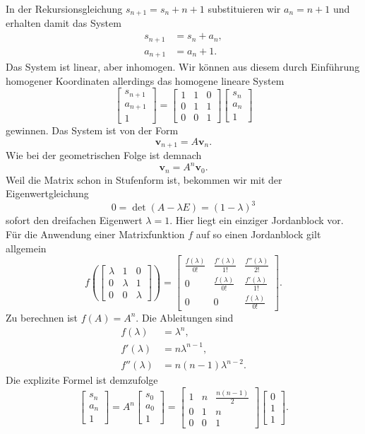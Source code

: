 \documentclass[a4paper,10pt,fleqn,twocolumn,twoside]{scrartcl}
\newcommand{\bvec}[1]{\mathbf{#1}}
\begin{document}
In der Rekursionsgleichung $s_{n+1} = s_n+n+1$ substituieren wir
$a_n = n+1$ und erhalten damit das System
\begin{align*}
s_{n+1} &= s_n + a_n,\\
a_{n+1} &= a_n + 1.
\end{align*}
Das System ist linear, aber inhomogen. Wir können aus diesem durch
Einführung homogener Koordinaten allerdings das homogene
lineare System
\[\begin{bmatrix}
s_{n+1}\\ a_{n+1}\\ 1
\end{bmatrix} = \begin{bmatrix}
1 & 1 & 0\\
0 & 1 & 1\\
0 & 0 & 1
\end{bmatrix}
\begin{bmatrix}
s_n\\ a_n\\ 1
\end{bmatrix}\]
gewinnen. Das System ist von der Form
\[\bvec v_{n+1} = A\bvec v_{n}.\]
Wie bei der geometrischen Folge ist demnach
\[\bvec v_n = A^n\bvec v_0.\]
Weil die Matrix schon in Stufenform ist, bekommen wir mit der
Eigenwertgleichung
\[0 = \det(A-\lambda E) = (1-\lambda)^3\]
sofort den dreifachen Eigenwert $\lambda = 1$. Hier liegt ein
einziger Jordanblock vor. Für die Anwendung einer Matrixfunktion $f$
auf so einen Jordanblock gilt allgemein%
\[f(\begin{bmatrix}
\lambda & 1 & 0\\[2pt]
0 & \lambda & 1\\[2pt]
0 & 0 & \lambda
\end{bmatrix})
= \begin{bmatrix}
\frac{f(\lambda)}{0!} & \frac{f'(\lambda)}{1!} & \frac{f''(\lambda)}{2!}\\[2pt]
0 & \frac{f(\lambda)}{0!} & \frac{f'(\lambda)}{1!}\\[2pt]
0 & 0 & \frac{f(\lambda)}{0!}
\end{bmatrix}.\]
Zu berechnen ist $f(A)=A^n$. Die Ableitungen sind
\begin{align*}
f(\lambda) &= \lambda^n,\\
f'(\lambda) &= n\lambda^{n-1},\\
f''(\lambda) &= n(n-1)\lambda^{n-2}.
\end{align*}
Die explizite Formel ist demzufolge
\[\begin{bmatrix}
s_n\\ a_n\\ 1
\end{bmatrix} = A^n\begin{bmatrix}
s_0\\ a_0\\ 1
\end{bmatrix}
= \begin{bmatrix}
1 & n & \frac{n(n-1)}{2}\\
0 & 1 & n\\
0 & 0 & 1
\end{bmatrix}
\begin{bmatrix}
0\\ 1\\ 1
\end{bmatrix}.\]
\end{document}
